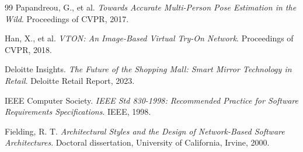 \begin{thebibliography}{99}
Papandreou, G., et al.
\textit{Towards Accurate Multi-Person Pose Estimation in the Wild}.
Proceedings of CVPR, 2017.

Han, X., et al.
\textit{VTON: An Image-Based Virtual Try-On Network}.
Proceedings of CVPR, 2018.

Deloitte Insights.
\textit{The Future of the Shopping Mall: Smart Mirror Technology in Retail}.
Deloitte Retail Report, 2023.

IEEE Computer Society.
\textit{IEEE Std 830-1998: Recommended Practice for Software Requirements Specifications}.
IEEE, 1998.

Fielding, R. T.
\textit{Architectural Styles and the Design of Network-Based Software Architectures}.
Doctoral dissertation, University of California, Irvine, 2000.

\end{thebibliography}

